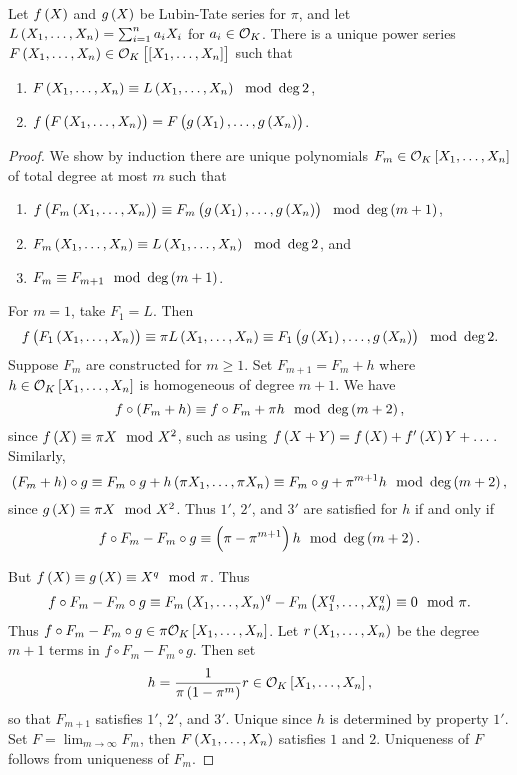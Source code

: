 \begin{lemma}
\label{lem:20.8}
Let $ f\br{X} $ and $ g\br{X} $ be Lubin-Tate series for $ \pi $, and let $ L\br{X_1, \dots, X_n} = \sum_{i = 1}^n a_iX_i $ for $ a_i \in \mathcal{O}_K $. There is a unique power series $ F\br{X_1, \dots, X_n} \in \OOO_K\sbr{\sbr{X_1, \dots, X_n}} $ such that
\begin{enumerate}
\item $ F\br{X_1, \dots, X_n} \equiv L\br{X_1, \dots, X_n} \mod \deg 2 $,
\item $ f\br{F\br{X_1, \dots, X_n}} = F\br{g\br{X_1}, \dots, g\br{X_n}} $.
\end{enumerate}
\end{lemma}

\begin{proof}
We show by induction there are unique polynomials $ F_m \in \OOO_K\sbr{X_1, \dots, X_n} $ of total degree at most $ m $ such that
\begin{enumerate}[label=\arabic*$ ' $.]
\item $ f\br{F_m\br{X_1, \dots, X_n}} \equiv F_m\br{g\br{X_1}, \dots, g\br{X_n}} \mod \deg \br{m + 1} $,
\item $ F_m\br{X_1, \dots, X_n} \equiv L\br{X_1, \dots, X_n} \mod \deg 2 $, and
\item $ F_m \equiv F_{m + 1} \mod \deg \br{m + 1} $.
\end{enumerate}
For $ m = 1 $, take $ F_1 = L $. Then
$$ f\br{F_1\br{X_1, \dots, X_n}} \equiv \pi L\br{X_1, \dots, X_n} \equiv F_1\br{g\br{X_1}, \dots, g\br{X_n}} \mod \deg 2. $$
Suppose $ F_m $ are constructed for $ m \ge 1 $. Set $ F_{m + 1} = F_m + h $ where $ h \in \OOO_K\sbr{X_1, \dots, X_n} $ is homogeneous of degree $ m + 1 $. We have
$$ f \circ \br{F_m + h} \equiv f \circ F_m + \pi h \mod \deg \br{m + 2}, $$
since $ f\br{X} \equiv \pi X \mod X^2 $, such as using $ f\br{X + Y} = f\br{X} + f'\br{X}Y + \dots $. Similarly,
$$ \br{F_m + h} \circ g \equiv F_m \circ g + h\br{\pi X_1, \dots, \pi X_n} \equiv F_m \circ g + \pi^{m + 1}h \mod \deg \br{m + 2}, $$
since $ g\br{X} \equiv \pi X \mod X^2 $. Thus $ 1' $, $ 2' $, and $ 3' $ are satisfied for $ h $ if and only if
$$ f \circ F_m - F_m \circ g \equiv \br{\pi - \pi^{m + 1}}h \mod \deg \br{m + 2}. $$

\pagebreak

But $ f\br{X} \equiv g\br{X} \equiv X^q \mod \pi $. Thus
$$ f \circ F_m - F_m \circ g \equiv F_m\br{X_1, \dots, X_n}^q - F_m\br{X_1^q, \dots, X_n^q} \equiv 0 \mod \pi. $$
Thus $ f \circ F_m - F_m \circ g \in \pi\OOO_K\sbr{X_1, \dots, X_n} $. Let $ r\br{X_1, \dots, X_n} $ be the degree $ m + 1 $ terms in $ f \circ F_m - F_m \circ g $. Then set
$$ h = \dfrac{1}{\pi\br{1 - \pi^m}}r \in \OOO_K\sbr{X_1, \dots, X_n}, $$
so that $ F_{m + 1} $ satisfies $ 1' $, $ 2' $, and $ 3' $. Unique since $ h $ is determined by property $ 1' $. Set $ F = \lim_{m \to \infty} F_m $, then $ F\br{X_1, \dots, X_n} $ satisfies $ 1 $ and $ 2 $. Uniqueness of $ F $ follows from uniqueness of $ F_m $.
\end{proof}

